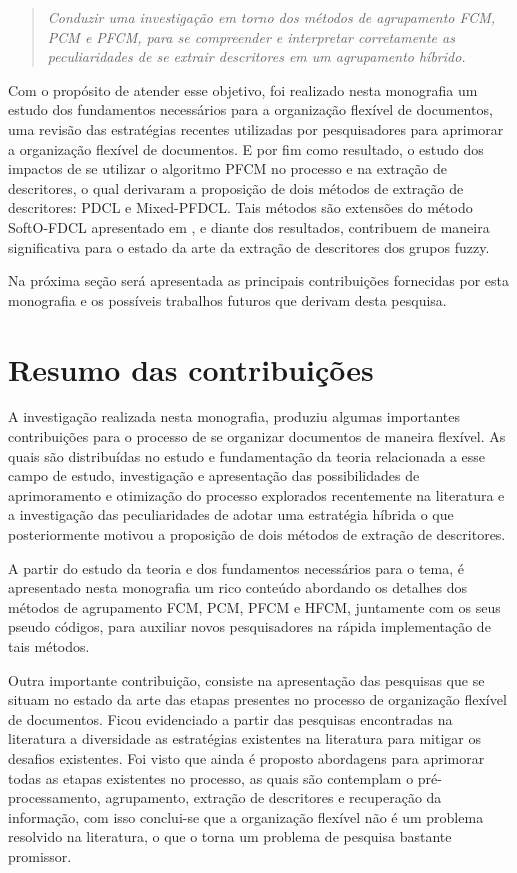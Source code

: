 \begin{quote}
\textit{Conduzir uma investigação em torno dos métodos de agrupamento FCM, PCM e PFCM, para
se compreender e interpretar corretamente as peculiaridades de se extrair descritores em um
agrupamento híbrido.}
\end{quote}

Com o propósito de atender esse objetivo, foi realizado nesta monografia um estudo dos fundamentos
necessários para a organização flexível de documentos, uma revisão das estratégias recentes
utilizadas por pesquisadores para aprimorar a organização flexível de documentos. E por fim como
resultado, o estudo dos impactos de se utilizar o algoritmo PFCM no processo e na extração de
descritores, o qual derivaram a proposição de dois métodos de extração de descritores: PDCL e
Mixed-PFDCL. Tais métodos são extensões do método SoftO-FDCL apresentado em \cite{Nogueira2013}, e
diante dos resultados, contribuem de maneira significativa para o estado da arte da extração de
descritores dos grupos fuzzy.

Na próxima seção será apresentada as principais contribuições fornecidas por esta monografia e os
possíveis trabalhos futuros que derivam desta pesquisa.

\section{Resumo das contribuições}

A investigação realizada nesta monografia, produziu algumas importantes contribuições para o
processo de se organizar documentos de maneira flexível. As quais são distribuídas no estudo e
fundamentação da teoria relacionada a esse campo de estudo, investigação e apresentação das
possibilidades de aprimoramento e otimização do processo explorados recentemente na literatura e a
investigação das peculiaridades de adotar uma estratégia híbrida o que posteriormente motivou a
proposição de dois métodos de extração de descritores. 

A partir do estudo da teoria e dos fundamentos necessários para o tema, é apresentado nesta
monografia um rico conteúdo abordando os detalhes dos métodos de agrupamento FCM, PCM, PFCM e HFCM,
juntamente com os seus pseudo códigos, para auxiliar novos pesquisadores na rápida implementação de
tais métodos.

Outra importante contribuição, consiste na apresentação das pesquisas que se situam no estado da
arte das etapas presentes no processo de organização flexível de documentos. Ficou evidenciado a
partir das pesquisas encontradas na literatura a diversidade as estratégias existentes na literatura
para mitigar os desafios existentes. Foi visto que ainda é proposto abordagens para aprimorar todas
as etapas existentes no processo, as quais são contemplam o pré-processamento, agrupamento, extração
de descritores e recuperação da informação, com isso conclui-se que a organização flexível não é um
problema resolvido na literatura, o que o torna um problema de pesquisa bastante promissor. 

